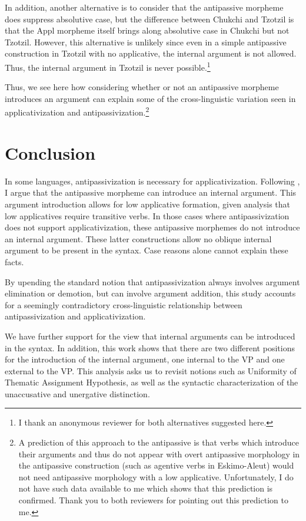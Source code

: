 \documentclass[output=paper,colorlinks,citecolor=brown,modfonts,nonflat]{langsci/langscibook}
\begin{document}
In addition, another alternative is to consider that the antipassive morpheme does suppress absolutive case, but the difference between Chukchi and Tzotzil is that the Appl morpheme itself brings along absolutive case in Chukchi but not Tzotzil. However, this alternative is unlikely since even in a simple antipassive construction in Tzotzil with no applicative, the internal argument is not allowed. Thus, the internal argument in Tzotzil is never possible.\footnote{I thank an anonymous reviewer for both alternatives suggested here.}

Thus, we see here how considering whether or not an antipassive morpheme introduces an argument can explain some of the cross-linguistic variation seen in applicativization and antipassivization.\footnote{A prediction of this approach to the antipassive is that verbs which introduce their arguments and thus do not appear with overt antipassive morphology in the antipassive construction (such as agentive verbs in Eskimo-Aleut) would not need antipassive morphology with a low applicative. Unfortunately, I do not have such data available to me which shows that this prediction is confirmed. Thank you to both reviewers for pointing out this prediction to me.}

\section{Conclusion} %

In some languages, antipassivization is necessary for applicativization. Following \citet{Basilico2012, Basilico2017}, I argue that the antipassive morpheme can introduce an internal argument. This argument introduction allows for low applicative formation, given  analysis that low applicatives require transitive verbs. In those cases where antipassivization does not support applicativization, these antipassive morphemes do not introduce an internal argument. These latter constructions allow no oblique internal argument to be present in the syntax. Case reasons alone cannot explain these facts.

By upending the standard notion that antipassivization always involves argument elimination or demotion, but can involve argument addition, this study accounts for a seemingly contradictory cross-linguistic relationship between antipassivization and applicativization.

We have further support for the view that internal arguments can be introduced in the syntax. In addition, this work shows that there are two different positions for the introduction of the internal argument, one internal to the VP and one external to the VP. This analysis asks us to revisit notions such as  Uniformity of Thematic Assignment Hypothesis, as well as the syntactic characterization of the unaccusative and unergative distinction.
\end{document}
